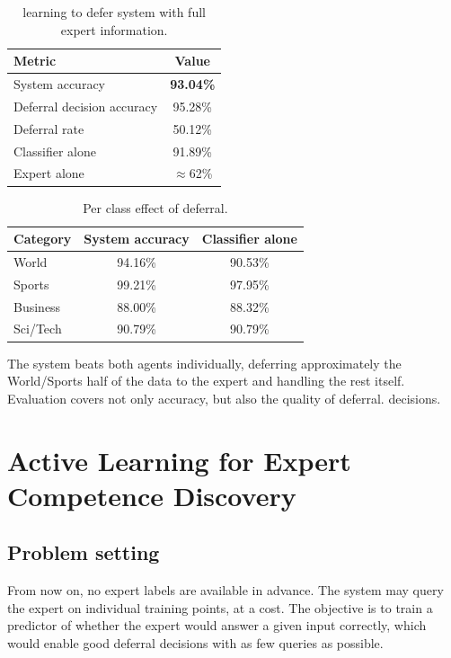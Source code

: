 \documentclass[11pt]{article}
\begin{document}
\begin{table}[H]
\centering
\begin{tabular}{lc}
\toprule
Metric & Value \\
\midrule
System accuracy & \textbf{93.04\%} \\
Deferral decision accuracy & 95.28\% \\
Deferral rate & 50.12\% \\
\midrule
Classifier alone & 91.89\% \\
Expert alone & $\approx$62\% \\
\bottomrule
\end{tabular}
\caption{learning to defer system with full expert information.}
\end{table}

\begin{table}[H]
\centering
\begin{tabular}{lcc}
\toprule
Category & System accuracy & Classifier alone \\
\midrule
World & 94.16\% & 90.53\% \\
Sports & 99.21\% & 97.95\% \\
Business & 88.00\% & 88.32\% \\
Sci/Tech & 90.79\% & 90.79\% \\
\bottomrule
\end{tabular}
\caption{Per class effect of deferral.}
\end{table}

The system beats both agents individually, deferring approximately the World/Sports half of the data to the expert and handling the rest itself. Evaluation covers not only accuracy, but also the quality of deferral. decisions.

\section{Active Learning for Expert Competence Discovery}
\label{sec:al}

\subsection{Problem setting}
From now on, no expert labels are available in advance. The system may query the expert on individual training points, at a cost. The objective is to train a predictor of whether the expert would answer a given input correctly, which would enable good deferral decisions with as few queries as possible.
\end{document}
